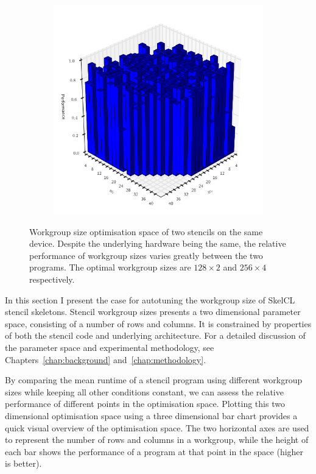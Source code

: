 \begin{figure}
\begin{subfigure}[h]{.49\textwidth}
\includegraphics[width=1.0\textwidth]{img/motivation_4}
\vspace{-1.5em} %
\caption{}
\label{fig:motivation-4}
\end{subfigure}
\caption[Workgroup size optimisation space across stencils]{%
  Workgroup size optimisation space of two stencils on the same
  device. Despite the underlying hardware being the same, the relative
  performance of workgroup sizes varies greatly between the two
  programs. The optimal workgroup sizes are $128\times2$ and
  $256\times4$ respectively.%
}
\label{fig:motivation-prog}
\end{figure}

In this section I present the case for autotuning the workgroup size
of SkelCL stencil skeletons. Stencil workgroup sizes presents a two
dimensional parameter space, consisting of a number of rows and
columns. It is constrained by properties of both the stencil code and
underlying architecture. For a detailed discussion of the parameter
space and experimental methodology, see Chapters~\ref{chap:background}
and~\ref{chap:methodology}.

By comparing the mean runtime of a stencil program using different
workgroup sizes while keeping all other conditions constant, we can
assess the relative performance of different points in the
optimisation space. Plotting this two dimensional optimisation space
using a three dimensional bar chart provides a quick visual overview
of the optimisation space. The two horizontal axes are used to
represent the number of rows and columns in a workgroup, while the
height of each bar shows the performance of a program at that point in
the space (higher is better).

